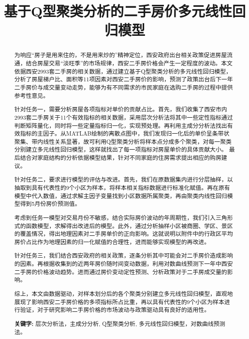\documentclass[withoutpreface,bwprint]{cumcmthesis} %
\title{基于Q型聚类分析的二手房价多元线性回归模型}
\begin{document}

\maketitle

\begin{abstract}%
    为响应“房子是用来住的，不是用来炒的”精神定位，西安政府出台相关政策促进房屋流通，结合房屋交易“淡旺季”的市场规律，西安二手房价格会产生一定程度的波动。本文依据西安2993套二手房的相关数据，通过建立基于Q型聚类分析的多元线性回归模型，分析了房屋梯户比、面积等11项因素对西安二手房价的影响，预测了政策出台后下一年二手房价与成交量变动走势，能够为有不同需求的市民家庭在选购二手房的过程中提供参考性意见。
   
    针对任务一，需要分析房屋各项指标对单价的贡献占比。首先，我们收集了西安市内2993套二手房关于11个有效指标的相关数据，采用层次分析法将其中一些定性指标通过判断矩阵量化，同时将一些定量指标归一化，实现预处理。再利用主成分分析法找出有效指标的主因子。从MATLAB绘制的离散点图中，我们发现归一化后的单价呈条带状聚集、带内线性关系显著，故可利用Q型聚类分析将样本点分成多个聚类，对每一聚类分别建立多元线性回归模型，这样就找出了每一项指标对房屋单价的具体贡献大小。 最后结合对家庭结构的分析依据模型结果，针对不同家庭的住房需求提出相应的购房建议。
    
    针对任务二，要求进行模型的评估与改进。首先，我们在原数据集内进行分层抽样，以抽取到具有代表性的9个小区为样本，将样本相关指标数据进行标准化赋值。再在原有模型中代入数值，通过求解主因子变量找到小区数据所属聚类，再由聚类内线性回归模型得到5月份房价预测值。
    
    考虑到任务一模型对交易月份不敏感，结合实际房价波动的年周期性，我们引入三角形式的函数模型，求解得出改进后的模型。此外，通过分析抽样小区被商圈、学区、景区的覆盖情况，得出地理因素对二手房单价的正向影响。这就说明以附件中的行政区平均房价占比作为地理因素的归一化赋值的合理性，进而能够实现模型的再改进。
    
    针对任务三，我们结合西安政府的相关政策，逐条分析其中可能会对二手房价造成影响的因素。再根据收集到的近两年房价随时间变动数据，利用对数曲线预测下一年中西安二手房的价格波动趋势。进而通过房价变动定性预测、分析政策对于二手房成交量的影响。
   
    综上，本文由数据驱动，对样本划分后的各个聚类分别建立多元线性回归模型，直观地展现了影响西安二手房价格的多项指标所占比重，再以具有代表性的9个小区为样本进行验证，对于研究影响二手房价格的市场波动与政策驱动具有良好的适用性。

  \textbf{关键字:} 层次分析法，主成分分析, Q型聚类分析, 多元线性回归模型，对数曲线预测法。

\end{abstract}
\end{document}

